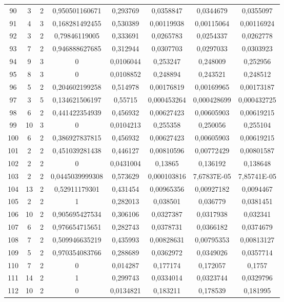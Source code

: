 \begin{longtable}{|c|c|c|c|c|c|c|c|}
90 & 3 & 2 & 0,950501160671 & 0,293769 & 0,0358847 & 0,0344679 & 0,0355097  \\
91 & 4 & 3 & 0,168281492455 & 0,530389 & 0,00119938 & 0,00115064 & 0,00116924  \\
92 & 3 & 2 & 0,79846119005 & 0,333691 & 0,0265783 & 0,0254337 & 0,0262778  \\
93 & 7 & 2 & 0,946888627685 & 0,312944 & 0,0307703 & 0,0297033 & 0,0303923  \\
94 & 9 & 3 & 0 & 0,0106044 & 0,253247 & 0,248009 & 0,252956  \\
95 & 8 & 3 & 0 & 0,0108852 & 0,248894 & 0,243521 & 0,248512  \\
96 & 5 & 2 & 0,204602199258 & 0,514978 & 0,00176819 & 0,00169965 & 0,00173187  \\
97 & 3 & 5 & 0,134621506197 & 0,55715 & 0,000453264 & 0,000428699 & 0,000432725  \\
98 & 6 & 2 & 0,441422354939 & 0,456932 & 0,00627423 & 0,00605903 & 0,00619215  \\
99 & 10 & 3 & 0 & 0,0104213 & 0,255358 & 0,250056 & 0,255104  \\
100 & 6 & 2 & 0,386927837815 & 0,456932 & 0,00627423 & 0,00605903 & 0,00619215  \\
101 & 2 & 2 & 0,451039281438 & 0,446127 & 0,00810596 & 0,00772429 & 0,00801587  \\
102 & 2 & 2 & 0 & 0,0431004 & 0,13865 & 0,136192 & 0,138648  \\
103 & 2 & 2 & 0,0445039999308 & 0,573629 & 0,000103816 & 7,67837E-05 & 7,85741E-05  \\
104 & 13 & 2 & 0,52911179301 & 0,431454 & 0,00965356 & 0,00927182 & 0,0094467  \\
105 & 2 & 2 & 1 & 0,282013 & 0,038501 & 0,036779 & 0,0381451  \\
106 & 10 & 2 & 0,905695427534 & 0,306106 & 0,0327387 & 0,0317938 & 0,032341  \\
107 & 6 & 2 & 0,976654715651 & 0,282743 & 0,0378731 & 0,0366182 & 0,0374679  \\
108 & 7 & 2 & 0,509946635219 & 0,435993 & 0,00828631 & 0,00795353 & 0,00813127  \\
109 & 5 & 2 & 0,970354083766 & 0,288689 & 0,0362972 & 0,0349026 & 0,0357714  \\
110 & 7 & 2 & 0 & 0,014287 & 0,177174 & 0,172057 & 0,1757  \\
111 & 14 & 2 & 1 & 0,299743 & 0,0334014 & 0,0323744 & 0,0329796  \\
112 & 10 & 2 & 0 & 0,0134821 & 0,183211 & 0,178539 & 0,181995  \\

\end{longtable}
